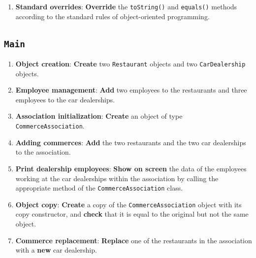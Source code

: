 \begin{enumerate}
        \begin{itemize}

            \item \texttt{addCommerce()}: \textbf{Adds} a commerce of any type to the association. \textbf{If} the commerce is already in the array or if the array is full, it \textbf{will not be added}.

            \item \texttt{replaceRestaurant()}: \textbf{Finds} a previously created restaurant within the association. \textbf{If} it is found, \textbf{replaces} it with a given car dealership.

            \item \texttt{printDealershipEmployees()}: A method that \textbf{shows on screen} the employees of those commerces that are car dealerships.

        \end{itemize}

    \item \textbf{Standard overrides}: \textbf{Override} the \texttt{toString()} and \texttt{equals()} methods according to the standard rules of object-oriented programming.

\end{enumerate}

\subsection{\texttt{Main}}

\begin{enumerate}

    \item \textbf{Object creation}: \textbf{Create} two \texttt{Restaurant} objects and two \texttt{CarDealership} objects.

    \item \textbf{Employee management}: \textbf{Add} two employees to the restaurants and three employees to the car dealerships.

    \item \textbf{Association initialization}: \textbf{Create} an object of type \texttt{CommerceAssociation}.

    \item \textbf{Adding commerces}: \textbf{Add} the two restaurants and the two car dealerships to the association.

    \item \textbf{Print dealership employees}: \textbf{Show on screen} the data of the employees working at the car dealerships within the association by calling the appropriate method of the \texttt{CommerceAssociation} class.

    \item \textbf{Object copy}: \textbf{Create} a copy of the \texttt{CommerceAssociation} object with its copy constructor, and \textbf{check} that it is equal to the original but not the same object.

    \item \textbf{Commerce replacement}: \textbf{Replace} one of the restaurants in the association with a \textbf{new} car dealership.

\end{enumerate}
